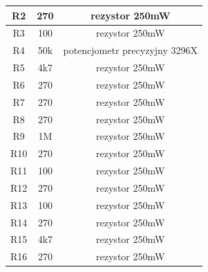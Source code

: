 \documentclass[12pt]{article}
\begin{document}
\begin{minipage}[t]{0.45\linewidth}
\begin{tabular}{|c|c|c|}
R2 & 270 & rezystor 250mW \\
\hline
R3 & 100 & rezystor 250mW \\
\hline
R4 & 50k & potencjometr precyzyjny 3296X \\
\hline
R5 & 4k7 & rezystor 250mW \\
\hline
R6 & 270 & rezystor 250mW \\
\hline
R7 & 270 & rezystor 250mW \\
\hline
R8 & 270 & rezystor 250mW \\
\hline
R9 & 1M & rezystor 250mW \\
\hline
R10 & 270 & rezystor 250mW \\
\hline
R11 & 100 & rezystor 250mW \\
\hline
R12 & 270 & rezystor 250mW \\
\hline
R13 & 100 & rezystor 250mW \\
\hline
R14 & 270 & rezystor 250mW \\
\hline
R15 & 4k7 & rezystor 250mW \\
\hline
R16 & 270 & rezystor 250mW \\
\hline
\end{tabular}
\end{minipage}
\end{document}
